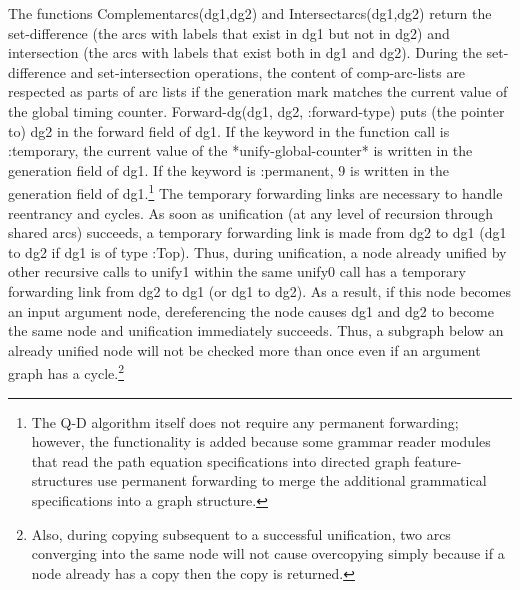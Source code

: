 The functions Complementarcs(dg1,dg2) and
Intersectarcs(dg1,dg2) return the set-difference (the arcs with
labels that exist in dg1 but not in dg2) and intersection
(the arcs with labels that exist both in dg1 and dg2).
 During the set-difference and
set-intersection operations, the content of comp-arc-lists
are respected as parts of arc lists if the generation mark
matches the current value of the global timing counter.
Forward-dg(dg1, dg2, :forward-type) puts (the pointer to)
dg2 in the forward field of dg1.  If the keyword in the
function call is :temporary, the current value of the
*unify-global-counter* is written in the generation field
of dg1. If the keyword is :permanent, 9 is written in the
generation field of dg1.\footnote{The Q-D algorithm itself does not
require any permanent forwarding; however, the functionality
is added because some grammar reader modules that read the
path equation specifications into directed graph feature-structures
use permanent forwarding to merge the additional
grammatical specifications into a graph
structure.}
 The temporary forwarding links 
are necessary to
handle reentrancy and cycles.  As soon as unification (at any
level of recursion through shared arcs) succeeds, a
temporary forwarding link is made from dg2 to dg1 (dg1 to
dg2 if dg1 is of type :Top). Thus, during unification,
a node already unified by other recursive calls to unify1
within the same unify0 call has a temporary forwarding link
from dg2 to dg1 (or dg1 to dg2). As a result, if this
node becomes an input argument node, dereferencing the node
causes dg1 and dg2 to become the same node and unification
immediately succeeds.  Thus, a subgraph below an already
unified node will not be checked more than once even if an
argument graph has a cycle.\footnote{Also, during copying 
subsequent to a successful unification, two arcs
converging into the same node will not cause overcopying
simply because if a node already has a copy then the copy is
returned.}


